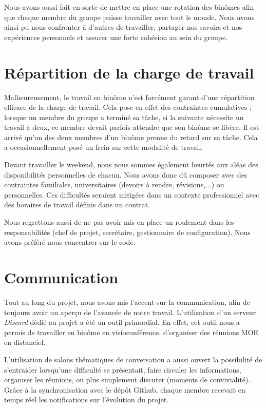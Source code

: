         Nous avons aussi fait en sorte de mettre en place une rotation des binômes afin
        que chaque membre du groupe puisse travailler avec tout le monde. Nous avons ainsi
        pu nous confronter à d'autres de travailler, partager nos savoirs et nos
        expériences personnels et assurer une forte cohésion au sein du groupe.

    \section{Répartition de la charge de travail}

        Malheureusement, le travail en binôme n'est forcément garant d'une répartition
        efficace de la charge de travail. Cela pose en effet des contraintes cumulatives ;
        lorsque un membre du groupe a terminé sa tâche, si la suivante nécessite un travail
        à deux, ce membre devait parfois attendre que son binôme se libère. Il est arrivé
        qu'un des deux membres d'un binôme prenne du retard sur sa tâche. Cela a
        occasionnellement posé un frein sur cette modalité de travail.

        Devant travailler le weekend, nous nous sommes également heurtés aux aléas des
        disponibilités personnelles de chacun. Nous avons donc dû composer avec des
        contraintes familiales, universitaires (devoirs à rendre, révisions,...) ou
        personnelles. Ces difficultés seraient mitigées dans un contexte professionnel
        avec des horaires de travail définis dans un contrat.

        Nous regrettons aussi de ne pas avoir mis en place un roulement dans les
        responsabilités (chef de projet, secrétaire, gestionnaire de configuration). Nous
        avons préféré nous concentrer sur le code.

    \section{Communication}

        Tout au long du projet, nous avons mis l'accent sur la communication, afin
        de toujours avoir un aperçu de l'avancée de notre travail. L'utilisation d'un
        serveur \emph{Discord} dédié au projet a été un outil primordial. En effet,
        cet outil nous a permis de travailler en binôme en visioconférence, d'organiser
        des réunions MOE en distanciel.

        L'utilisation de \og{}salons \fg{} thématiques de
        conversation a aussi ouvert la possibilité de s'entraider lorsqu'une difficulté se
        présentait, faire circuler les informations, organiser les réunions, ou plus
        simplement discuter (moments de convivialité). Grâce à la synchronisation avec
        le dépôt Github, chaque membre recevait en temps réel les notifications sur
        l'évolution du projet.

